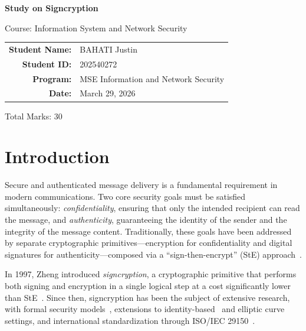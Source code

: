\documentclass[11pt,a4paper]{article}
\begin{document}
\begin{titlepage}
\centering
\vspace*{2cm}

{\LARGE\bfseries Study on Signcryption}

\vspace{1.5cm}

{\Large Course: Information System and Network Security}

\vspace{2cm}

{\large
\begin{tabular}{rl}
\textbf{Student Name:} & BAHATI Justin \\
\textbf{Student ID:} & 202540272 \\
\textbf{Program:} & MSE Information and Network Security \\
\textbf{Date:} & March 29, 2026 \\
\end{tabular}
}

\vfill

{\large Total Marks: 30}

\end{titlepage}

\tableofcontents
\newpage

\section{Introduction}

Secure and authenticated message delivery is a fundamental requirement in modern communications. Two core security goals must be satisfied simultaneously: \textit{confidentiality}, ensuring that only the intended recipient can read the message, and \textit{authenticity}, guaranteeing the identity of the sender and the integrity of the message content. Traditionally, these goals have been addressed by separate cryptographic primitives---encryption for confidentiality and digital signatures for authenticity---composed via a ``sign-then-encrypt'' (StE) approach~\cite{zheng1997}.

In 1997, Zheng introduced \textit{signcryption}, a cryptographic primitive that performs both signing and encryption in a single logical step at a cost significantly lower than StE~\cite{zheng1997}. Since then, signcryption has been the subject of extensive research, with formal security models~\cite{baek2002, an2002}, extensions to identity-based~\cite{malonelee2002, boyen2003} and elliptic curve~\cite{zheng1998} settings, and international standardization through ISO/IEC 29150~\cite{iso29150}.
\end{document}
